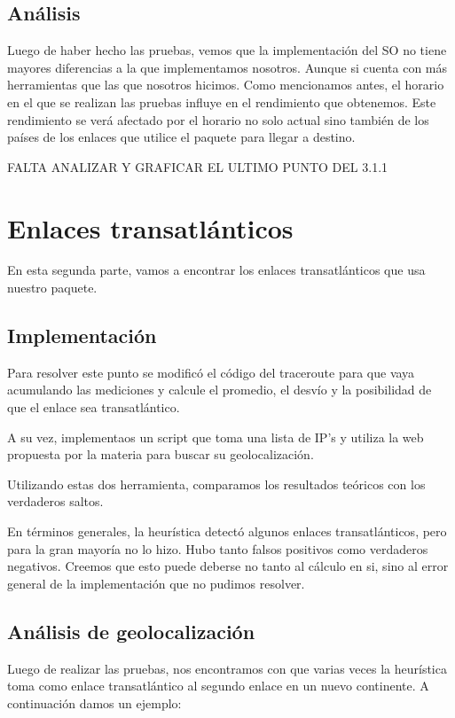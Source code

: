 \documentclass[%
	final,
	narroweqnarray,
	inline,
	twoside,
	]{ieee}
\begin{document}
\subsection{Análisis}
Luego de haber hecho las pruebas, vemos que la implementación del SO no tiene mayores diferencias a la que implementamos nosotros. Aunque si cuenta con más herramientas que las que nosotros hicimos. 
Como mencionamos antes, el horario en el que se realizan las pruebas influye en el rendimiento que obtenemos. Este rendimiento se verá afectado por el horario no solo actual sino también de los países de los enlaces que utilice el paquete para llegar a destino.

FALTA ANALIZAR Y GRAFICAR EL ULTIMO PUNTO DEL 3.1.1



\section{Enlaces transatlánticos}
En esta segunda parte, vamos a encontrar los enlaces transatlánticos que usa nuestro paquete.
\subsection{Implementación}
Para resolver este punto se modificó el código del traceroute para que vaya acumulando las mediciones y calcule el promedio, el desvío y la posibilidad de que el enlace sea transatlántico.

A su vez, implementaos un script que toma una lista de IP's y utiliza la web propuesta por la materia para buscar su geolocalización.

Utilizando estas dos herramienta, comparamos los resultados teóricos con los verdaderos saltos.

En términos generales, la heurística detectó algunos enlaces transatlánticos, pero para la gran mayoría no lo hizo. Hubo tanto falsos positivos como verdaderos negativos. Creemos que esto puede deberse no tanto al cálculo en si, sino al error general de la implementación que no pudimos resolver.

\subsection{Análisis de geolocalización}
Luego de realizar las pruebas,  nos encontramos con que varias veces la heurística toma como enlace transatlántico al segundo enlace en un nuevo continente. A continuación damos un ejemplo:
\end{document}
